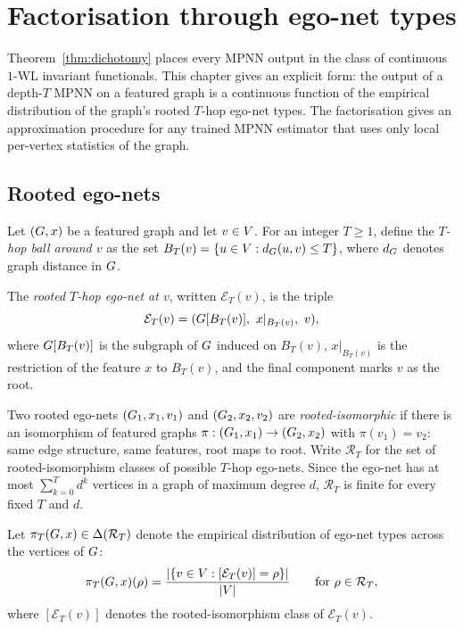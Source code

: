 
\section{Factorisation through ego-net types}\label{sec:characterization}

Theorem~\ref{thm:dichotomy} places every MPNN output in the class of continuous
$1$-WL invariant functionals. This chapter gives an explicit form: the
output of a depth-$T$ MPNN on a featured graph is a continuous function
of the empirical distribution of the graph's rooted $T$-hop ego-net
types. The factorisation gives an approximation procedure for any
trained MPNN estimator that uses only local per-vertex statistics of
the graph.

\subsection{Rooted ego-nets}

Let $(G, x)$ be a featured graph and let $v \in V$. For an
integer $T \ge 1$, define the \emph{$T$-hop ball around $v$} as the
set $B_T(v) = \{u \in V : d_G(u, v) \le T\}$, where
$d_G$ denotes graph distance in $G$.

\begin{definition}\label{def:egonet}
The \emph{rooted $T$-hop ego-net at $v$}, written $\mathcal{E}_T(v)$,
is the triple
\[
\mathcal{E}_T(v) = (G[B_T(v)],\ x|_{B_T(v)},\ v),
\]
where $G[B_T(v)]$ is the subgraph of $G$ induced on $B_T(v)$,
$x|_{B_T(v)}$ is the restriction of the feature $x$ to $B_T(v)$, and
the final component marks $v$ as the root.
\end{definition}

Two rooted ego-nets $(G_1, x_1, v_1)$ and $(G_2, x_2, v_2)$ are
\emph{rooted-isomorphic} if there is an isomorphism of featured graphs
$\pi : (G_1, x_1) \to (G_2, x_2)$ with $\pi(v_1) = v_2$: same
edge structure, same features, root maps to root. Write $\mathcal{R}_T$
for the set of rooted-isomorphism classes of possible $T$-hop
ego-nets. Since the ego-net has at most $\sum_{k=0}^T d^k$ vertices in
a graph of maximum degree $d$, $\mathcal{R}_T$ is finite for every
fixed $T$ and $d$.

\begin{definition}\label{def:pi-t}
Let $\pi_T(G, x) \in \Delta(\mathcal{R}_T)$ denote the empirical
distribution of ego-net types across the vertices of $G$:
\[
\pi_T(G, x)(\rho) = \frac{|\{v \in V : [\mathcal{E}_T(v)] =
\rho\}|}{|V|}
\qquad \text{for } \rho \in \mathcal{R}_T,
\]
where $[\mathcal{E}_T(v)]$ denotes the rooted-isomorphism class of
$\mathcal{E}_T(v)$.
\end{definition}

